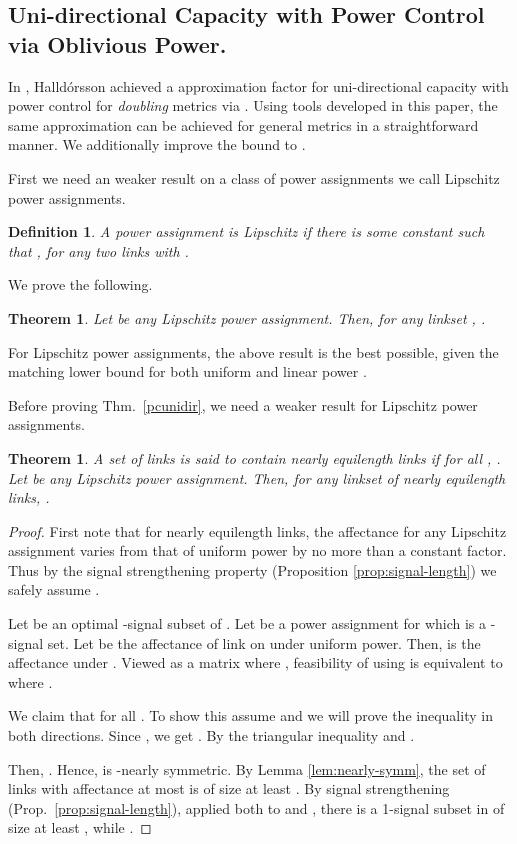 \documentclass[11pt]{amsart}
\newcounter{foo}
\newtheorem{theorem}[foo]{Theorem}
\newtheorem{defn}[foo]{Definition}
\begin{document}
\subsection{Uni-directional Capacity with Power Control via Oblivious Power.}

In \cite{us:esa09full}, Halld\'orsson achieved a  approximation factor for uni-directional capacity with
power control for \emph{doubling} metrics via .  Using tools
developed in this paper, the same approximation can be achieved for
general metrics in a straightforward manner.  We additionally improve
the bound to .

First we need an weaker result on a class of power assignments we call
Lipschitz power assignments.

\begin{defn}
A power assignment  is \emph{Lipschitz} if
there is some constant  such that , for any two links  with 
.
\end{defn}

We prove the following.
\begin{theorem}
\label{lipdelta}
Let  be any Lipschitz power assignment.
Then, for any linkset ,
.
\end{theorem}

For Lipschitz power assignments, the above result is the best
possible, given the matching lower bound for both uniform and linear 
power \cite{MoscibrodaOW07, ALP09}.

Before proving Thm.~\ref{pcunidir}, we need a weaker result for Lipschitz power assignments.


\begin{theorem}
\label{lipscitz-nealy-eql}
A set of links  is said to contain nearly equilength links if for all ,
.
Let  be any Lipschitz power assignment.
Then, for any linkset  of nearly equilength links, 
.
\end{theorem}


\begin{proof}
First note that for nearly equilength links, the affectance for any
Lipschitz assignment  varies from that of uniform power 
by no more than a constant factor. Thus by the signal strengthening
property (Proposition \ref{prop:signal-length}) we safely assume .

Let  be an optimal -signal subset of .
Let  be a power assignment for which  is a -signal set.
Let  be the affectance of
link  on  under uniform power. Then, 
is the affectance under .
Viewed as a matrix  where , feasibility of  using  
is equivalent to
 where .



We claim that  for all . To show this assume 
and we will prove the inequality in both directions. Since 
, we get 
. 
By the triangular inequality  and 
.


Then,
.
Hence,  is -nearly symmetric.
By Lemma \ref{lem:nearly-symm},
the set  of links with affectance at most  is of size at least .
By signal strengthening (Prop.~\ref{prop:signal-length}), applied both
to  and , there is a 1-signal subset  in  of size
at least , while .
\end{proof}
\end{document}
